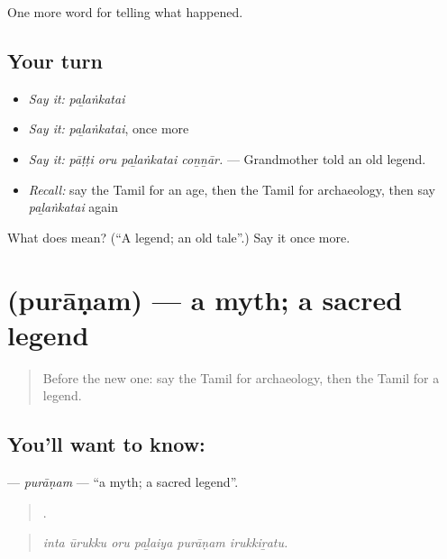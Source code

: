 \begin{grammarlens}[title={What you've built}]
One more word for telling what happened.
\end{grammarlens}

\subsection*{Your turn}
\begin{itemize}
\raggedright
  \item \emph{Say it:} \emph{paḻaṅkatai}
  \item \emph{Say it:} \emph{paḻaṅkatai}, once more
  \item \emph{Say it:} \emph{pāṭṭi oru paḻaṅkatai coṉṉār.} — Grandmother told an old legend.
  \item \emph{Recall:} say the Tamil for an age, then the Tamil for archaeology, then say \emph{paḻaṅkatai} again
\end{itemize}

\begin{tcolorbox}[breakable,colback=teal!4,colframe=teal!35!black,title={Before you move on}]
What does  mean? (\textquotedblleft{}A legend; an old tale\textquotedblright{}.) Say it once more.
\end{tcolorbox}
\section[\texorpdfstring{\ta{புராணம்} (purāṇam)}{புராணம் (purāṇam)}]{ (purāṇam) — a myth; a sacred legend}

\label{lesson:TA-C343-puranam}



\begin{quote}
Before the new one: say the Tamil for archaeology, then the Tamil for a legend.
\end{quote}

\subsection*{You'll want to know: }
\textbf{} — \emph{purāṇam} — \textquotedblleft{}a myth; a sacred legend\textquotedblright{}.

\begin{quote}
     .
\end{quote}

\begin{quote}
\emph{inta ūrukku oru paḻaiya purāṇam irukkiṟatu.}
\end{quote}

